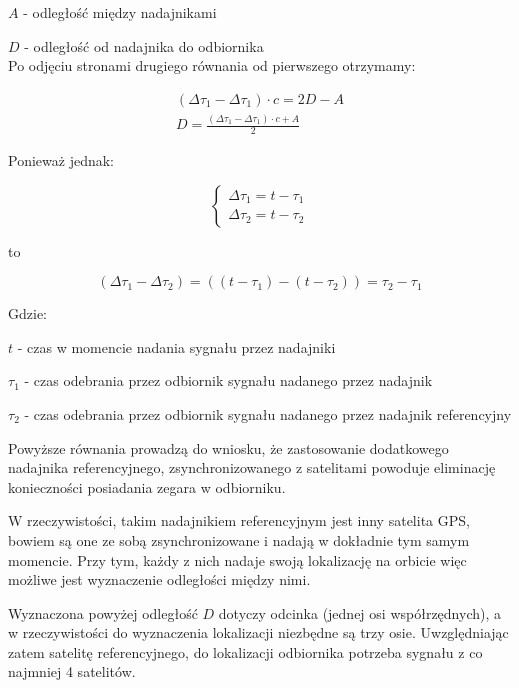 $A$ - odległość między nadajnikami

$D$ - odległość od nadajnika do odbiornika\\

Po odjęciu stronami drugiego równania od pierwszego otrzymamy:

\begin{gather}
(\Delta \tau_1  - \Delta \tau_1) \cdot c = 2D - A \\
D = \frac{(\Delta \tau_1  - \Delta \tau_1) \cdot c + A}{2} \nonumber 
\end{gather}

Ponieważ jednak:

\begin{equation}
\begin{cases}
	\Delta \tau_1 = t - \tau_1 \\
	\Delta \tau_2 = t- \tau_2
\end{cases}
\end{equation}

to

\begin{equation}
(\Delta \tau_1 - \Delta \tau_2) = ((t - \tau_1) - (t - \tau_2)) = \tau_2 - \tau_1
\end{equation}

Gdzie:

$t$ - czas w momencie nadania sygnału przez nadajniki

$\tau_1$ - czas odebrania przez odbiornik sygnału nadanego przez nadajnik

$\tau_2$ - czas odebrania przez odbiornik sygnału nadanego przez nadajnik referencyjny 

Powyższe równania prowadzą do wniosku, że zastosowanie dodatkowego nadajnika referencyjnego, zsynchronizowanego z satelitami powoduje eliminację konieczności posiadania zegara w odbiorniku.

W rzeczywistości, takim nadajnikiem referencyjnym jest inny satelita GPS, bowiem są one ze sobą zsynchronizowane i nadają w dokładnie tym samym momencie. Przy tym, każdy z nich nadaje swoją lokalizację na orbicie więc możliwe jest wyznaczenie odległości między nimi.

Wyznaczona powyżej odległość $D$ dotyczy odcinka (jednej osi współrzędnych), a w rzeczywistości do wyznaczenia lokalizacji niezbędne są trzy osie. Uwzględniając zatem satelitę referencyjnego, do lokalizacji odbiornika potrzeba sygnału z co najmniej 4 satelitów.

